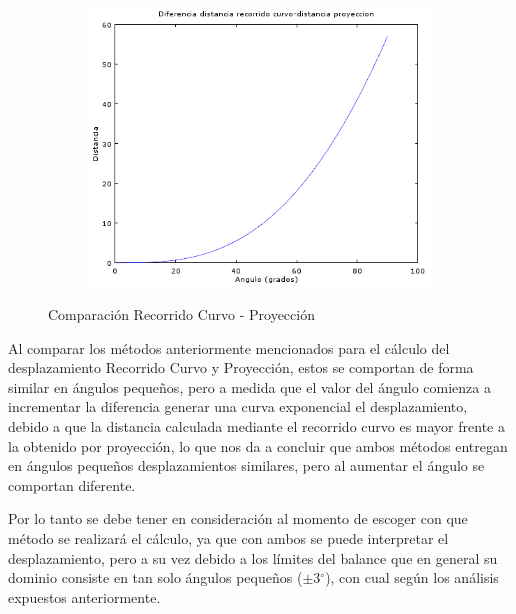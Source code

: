\documentclass[12pt,a4paper]{article}
\newcommand{\grad}{$^{\circ}$}
\begin{document}
\begin{figure}[H]
\begin{subfigure}{.5\textwidth}
	\end{subfigure}
	\begin{subfigure}{.5\textwidth}
		\includegraphics[width=.9\linewidth]{images/DiferenciaRec-Pro}
		\label{fig:comparacionDesplazamiento}
	\end{subfigure}%
		\captionsetup{labelformat=andtable}
		\caption{Comparación Recorrido Curvo - Proyección}
\end{figure}

Al comparar los métodos anteriormente mencionados para el cálculo del desplazamiento Recorrido Curvo y Proyección, estos se comportan de forma similar en ángulos pequeños, pero a medida que el valor del ángulo comienza a incrementar la diferencia generar una curva exponencial el desplazamiento, debido a que la distancia calculada mediante el recorrido curvo es mayor frente a la obtenido por proyección, lo que nos da a concluir que ambos métodos entregan en ángulos pequeños desplazamientos similares, pero al aumentar el ángulo se comportan diferente.

Por lo tanto se debe tener en consideración al momento de escoger con que método se realizará el cálculo, ya que con ambos se puede interpretar el desplazamiento, pero a su vez debido a los límites del balance que en general su dominio consiste en tan solo ángulos pequeños ($\pm 3$\grad), con cual según los análisis expuestos anteriormente.
\end{document}
